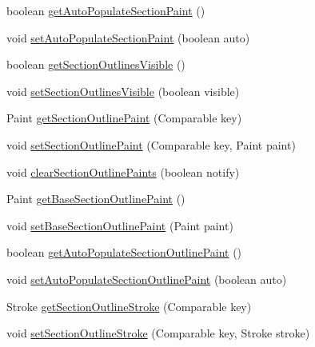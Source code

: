 \begin{DoxyCompactItemize}
\item 
boolean \mbox{\hyperlink{classorg_1_1jfree_1_1chart_1_1plot_1_1_pie_plot_a3765f76c003c6a46ab710dd190bc544a}{get\+Auto\+Populate\+Section\+Paint}} ()
\item 
void \mbox{\hyperlink{classorg_1_1jfree_1_1chart_1_1plot_1_1_pie_plot_ab0c2aa9c5804efab0ee2cb5330455222}{set\+Auto\+Populate\+Section\+Paint}} (boolean auto)
\item 
boolean \mbox{\hyperlink{classorg_1_1jfree_1_1chart_1_1plot_1_1_pie_plot_a071003f5ce49b26446c76598ce3b63f6}{get\+Section\+Outlines\+Visible}} ()
\item 
void \mbox{\hyperlink{classorg_1_1jfree_1_1chart_1_1plot_1_1_pie_plot_a1bd6cc215c5393df4f17f499c92b08bf}{set\+Section\+Outlines\+Visible}} (boolean visible)
\item 
Paint \mbox{\hyperlink{classorg_1_1jfree_1_1chart_1_1plot_1_1_pie_plot_ad5075d6d33c6dfbaab396a2b4a6b45bf}{get\+Section\+Outline\+Paint}} (Comparable key)
\item 
void \mbox{\hyperlink{classorg_1_1jfree_1_1chart_1_1plot_1_1_pie_plot_a07d24c6dfd9bde2ec5db77a1bed07506}{set\+Section\+Outline\+Paint}} (Comparable key, Paint paint)
\item 
void \mbox{\hyperlink{classorg_1_1jfree_1_1chart_1_1plot_1_1_pie_plot_acd57d025fefee2aeefeb14600e1a4748}{clear\+Section\+Outline\+Paints}} (boolean notify)
\item 
Paint \mbox{\hyperlink{classorg_1_1jfree_1_1chart_1_1plot_1_1_pie_plot_a09734d6fd44506facb9a597034af3eea}{get\+Base\+Section\+Outline\+Paint}} ()
\item 
void \mbox{\hyperlink{classorg_1_1jfree_1_1chart_1_1plot_1_1_pie_plot_ad5603a00bd3987c1735ae3c537453424}{set\+Base\+Section\+Outline\+Paint}} (Paint paint)
\item 
boolean \mbox{\hyperlink{classorg_1_1jfree_1_1chart_1_1plot_1_1_pie_plot_ad11b37f9c00a5465c12b2dab8570831f}{get\+Auto\+Populate\+Section\+Outline\+Paint}} ()
\item 
void \mbox{\hyperlink{classorg_1_1jfree_1_1chart_1_1plot_1_1_pie_plot_aca4ab53ff3369f59dce6538e97bbd637}{set\+Auto\+Populate\+Section\+Outline\+Paint}} (boolean auto)
\item 
Stroke \mbox{\hyperlink{classorg_1_1jfree_1_1chart_1_1plot_1_1_pie_plot_a5a568c273b4e925fd3c93647b806a9b9}{get\+Section\+Outline\+Stroke}} (Comparable key)
\item 
void \mbox{\hyperlink{classorg_1_1jfree_1_1chart_1_1plot_1_1_pie_plot_acd082f96925c46a66807857e4314b9ae}{set\+Section\+Outline\+Stroke}} (Comparable key, Stroke stroke)

\end{DoxyCompactItemize}
